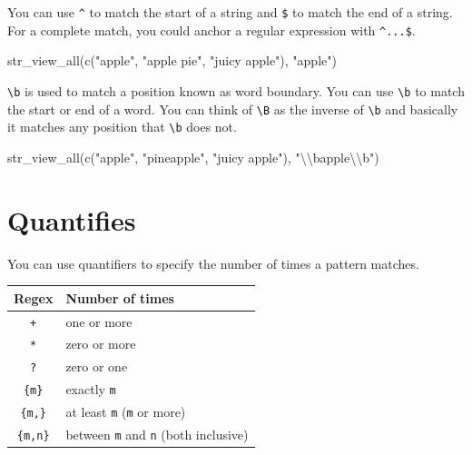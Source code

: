 \documentclass[
]{book}
\newenvironment{Shaded}{\begin{snugshade}}{\end{snugshade}}
\newcommand{\FunctionTok}[1]{\textcolor[rgb]{0.00,0.00,0.00}{#1}}
\newcommand{\NormalTok}[1]{#1}
\newcommand{\SpecialCharTok}[1]{\textcolor[rgb]{0.00,0.00,0.00}{#1}}
\newcommand{\StringTok}[1]{\textcolor[rgb]{0.31,0.60,0.02}{#1}}
\begin{document}
You can use \texttt{\^{}} to match the start of a string and \texttt{\$} to match the end of a string. For a complete match, you could anchor a regular expression with \texttt{\^{}...\$}.

\begin{Shaded}
\begin{Highlighting}[]
\FunctionTok{str\_view\_all}\NormalTok{(}\FunctionTok{c}\NormalTok{(}\StringTok{"apple"}\NormalTok{, }\StringTok{"apple pie"}\NormalTok{, }\StringTok{"juicy apple"}\NormalTok{), }\StringTok{"apple"}\NormalTok{)}
\end{Highlighting}
\end{Shaded}

\texttt{\textbackslash{}b} is used to match a position known as word boundary. You can use \texttt{\textbackslash{}b} to match the start or end of a word. You can think of \texttt{\textbackslash{}B} as the inverse of \texttt{\textbackslash{}b} and basically it matches any position that \texttt{\textbackslash{}b} does not.

\begin{Shaded}
\begin{Highlighting}[]
\FunctionTok{str\_view\_all}\NormalTok{(}\FunctionTok{c}\NormalTok{(}\StringTok{"apple"}\NormalTok{, }\StringTok{"pineapple"}\NormalTok{, }\StringTok{"juicy apple"}\NormalTok{), }\StringTok{"}\SpecialCharTok{\textbackslash{}\textbackslash{}}\StringTok{bapple}\SpecialCharTok{\textbackslash{}\textbackslash{}}\StringTok{b"}\NormalTok{)}
\end{Highlighting}
\end{Shaded}

\hypertarget{quantifies}{%
\section{Quantifies}\label{quantifies}}

You can use quantifiers to specify the number of times a pattern matches.

\begin{longtable}[]{@{}cl@{}}
\toprule
Regex & Number of times \\
\midrule
\endhead
\texttt{+} & one or more \\
\texttt{*} & zero or more \\
\texttt{?} & zero or one \\
\texttt{\{m\}} & exactly \texttt{m} \\
\texttt{\{m,\}} & at least \texttt{m} (\texttt{m} or more) \\
\texttt{\{m,n\}} & between \texttt{m} and \texttt{n} (both inclusive) \\
\bottomrule
\end{longtable}
\end{document}
